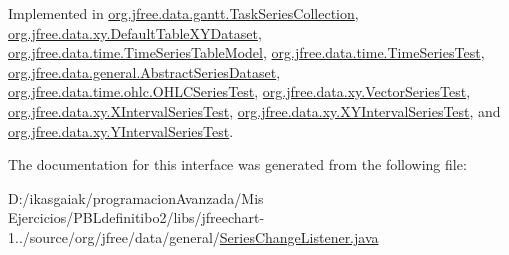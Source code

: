 Implemented in \mbox{\hyperlink{classorg_1_1jfree_1_1data_1_1gantt_1_1_task_series_collection_a57bb72acb135fb0dea4ff321dd58faa4}{org.\+jfree.\+data.\+gantt.\+Task\+Series\+Collection}}, \mbox{\hyperlink{classorg_1_1jfree_1_1data_1_1xy_1_1_default_table_x_y_dataset_ad55c61c1cd535e757c2542daf8c36808}{org.\+jfree.\+data.\+xy.\+Default\+Table\+X\+Y\+Dataset}}, \mbox{\hyperlink{classorg_1_1jfree_1_1data_1_1time_1_1_time_series_table_model_a677a0cd7e6da07877e06848a43056c26}{org.\+jfree.\+data.\+time.\+Time\+Series\+Table\+Model}}, \mbox{\hyperlink{classorg_1_1jfree_1_1data_1_1time_1_1_time_series_test_a57d6e460a96c8212fed888ae1f2d22cd}{org.\+jfree.\+data.\+time.\+Time\+Series\+Test}}, \mbox{\hyperlink{classorg_1_1jfree_1_1data_1_1general_1_1_abstract_series_dataset_a675989ab4880ab0456aabb1eae97d832}{org.\+jfree.\+data.\+general.\+Abstract\+Series\+Dataset}}, \mbox{\hyperlink{classorg_1_1jfree_1_1data_1_1time_1_1ohlc_1_1_o_h_l_c_series_test_a4a44187607adc569862f1a987c53926a}{org.\+jfree.\+data.\+time.\+ohlc.\+O\+H\+L\+C\+Series\+Test}}, \mbox{\hyperlink{classorg_1_1jfree_1_1data_1_1xy_1_1_vector_series_test_ab049ec8170566cf3bfe34c6ff1b47eed}{org.\+jfree.\+data.\+xy.\+Vector\+Series\+Test}}, \mbox{\hyperlink{classorg_1_1jfree_1_1data_1_1xy_1_1_x_interval_series_test_a8c0912dbcbb4b7813965cbd9652d9002}{org.\+jfree.\+data.\+xy.\+X\+Interval\+Series\+Test}}, \mbox{\hyperlink{classorg_1_1jfree_1_1data_1_1xy_1_1_x_y_interval_series_test_a5d77fdc32fed928c33af80502526fb2d}{org.\+jfree.\+data.\+xy.\+X\+Y\+Interval\+Series\+Test}}, and \mbox{\hyperlink{classorg_1_1jfree_1_1data_1_1xy_1_1_y_interval_series_test_a03898d82f545814b3026e56a0d455747}{org.\+jfree.\+data.\+xy.\+Y\+Interval\+Series\+Test}}.



The documentation for this interface was generated from the following file\+:\begin{DoxyCompactItemize}
\item 
D\+:/ikasgaiak/programacion\+Avanzada/\+Mis Ejercicios/\+P\+B\+Ldefinitibo2/libs/jfreechart-\/1../source/org/jfree/data/general/\mbox{\hyperlink{_series_change_listener_8java}{Series\+Change\+Listener.\+java}}\end{DoxyCompactItemize}
